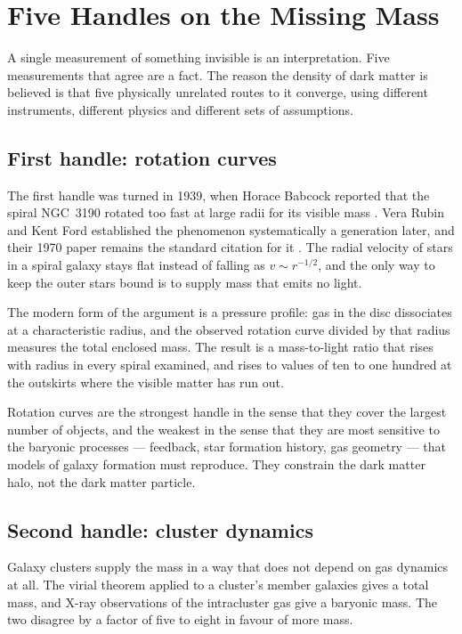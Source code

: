 
\chapter{Five Handles on the Missing Mass}
\label{ch:handles}

A single measurement of something invisible is an interpretation. Five
measurements that agree are a fact. The reason the density of dark matter is
believed is that five physically unrelated routes to it converge, using
different instruments, different physics and different sets of assumptions.

\section{First handle: rotation curves}The first handle was turned in 1939, when Horace Babcock reported
that the spiral NGC~3190 rotated too fast at large radii for its visible
mass . Vera Rubin and Kent Ford established the phenomenon
systematically a generation later, and their 1970 paper remains the standard
citation for it . The radial velocity of stars in a
spiral galaxy stays flat instead of falling as $v \sim r^{-1/2}$, and the
only way to keep the outer stars bound is to supply mass that emits no
light.

The modern form of the argument is a pressure profile: gas in the disc
dissociates at a characteristic radius, and the observed rotation curve
divided by that radius measures the total enclosed mass. The result is a
mass-to-light ratio that rises with radius in every spiral examined, and
rises to values of ten to one hundred at the outskirts where the visible
matter has run out.

Rotation curves are the strongest handle in the sense that they cover the
largest number of objects, and the weakest in the sense that they are most
sensitive to the baryonic processes --- feedback, star formation history,
gas geometry --- that models of galaxy formation must reproduce. They
constrain the dark matter halo, not the dark matter particle.

\section{Second handle: cluster dynamics}Galaxy clusters supply the mass in a way that does not depend on
gas dynamics at all. The virial theorem applied to a cluster's member
galaxies gives a total mass, and X-ray observations of the intracluster gas
give a baryonic mass. The two disagree by a factor of five to eight in
favour of more mass.

